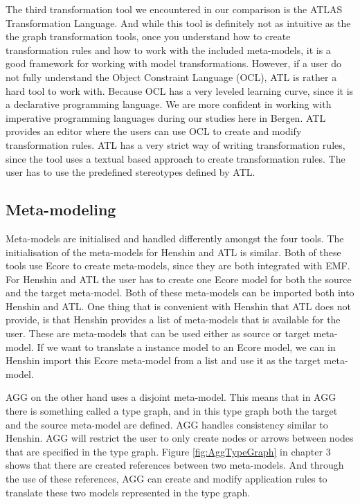 The third transformation tool we encountered in our comparison is the ATLAS
Transformation Language. And while this tool is definitely not as intuitive as
the the graph transformation tools, once you understand how to create
transformation rules and how to work with the included meta-models, it is a
good framework for working with model transformations. However, if a user do
not fully understand the Object Constraint Language (OCL), ATL is rather a hard
tool to work with. Because OCL has a very leveled learning curve, since it is a
declarative programming language. We are more confident in working with
imperative programming languages during our studies here in Bergen. ATL
provides an editor where the users can use OCL to create and modify
transformation rules. ATL has a very strict way of writing transformation
rules, since the tool uses a textual based approach to create transformation
rules. The user has to use the predefined stereotypes defined by ATL.

\subsection{Meta-modeling}

Meta-models are initialised and handled differently amongst the four tools.
The initialisation of the meta-models for Henshin and ATL is similar. Both of
these tools use Ecore to create meta-models, since they are both integrated with
EMF. For Henshin and ATL the user has to create one Ecore model for both the
source and the target meta-model. Both of these meta-models can be imported both
into Henshin and ATL. One thing that is convenient with Henshin that ATL does
not provide, is that Henshin provides a list of meta-models that is available
for the user. These are meta-models that can be used either as source or target
meta-model. If we want to translate a instance model to an Ecore model, we can
in Henshin import this Ecore meta-model from a list and use it as the target
meta-model.

AGG on the other hand uses a disjoint meta-model. This means that in AGG there
is something called a type graph, and in this type graph both the target and
the source meta-model are defined. AGG handles consistency similar to
Henshin. AGG will restrict the user to only create nodes or arrows between
nodes that are specified in the type graph. Figure \ref{fig:AggTypeGraph}
in chapter 3 shows that there are created references between two meta-models. And
through the use of these references, AGG can create and modify application
rules to translate these two models represented in the type graph. 

